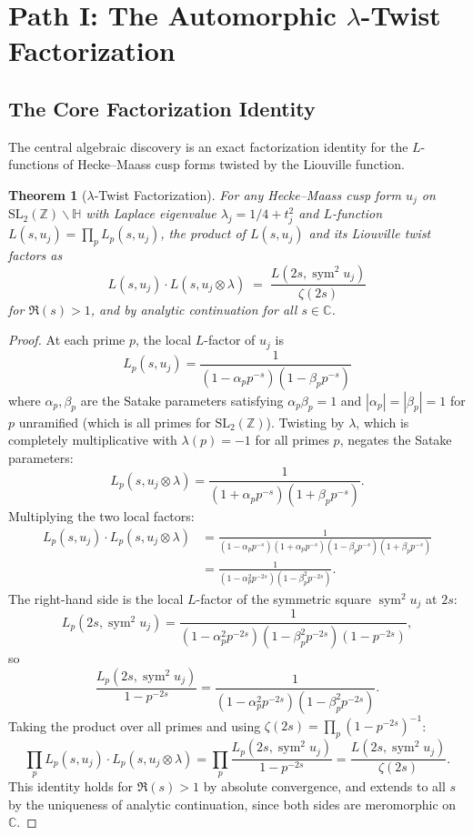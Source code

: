 \documentclass[11pt,a4paper]{article}
\theoremstyle{plain}
\newtheorem{theorem}{Theorem}[section]
\theoremstyle{definition}
\newcommand{\SL}{\mathrm{SL}_2}
\newcommand{\sym}{\operatorname{sym}}
\begin{document}
\section{Path I: The Automorphic $\lambda$-Twist Factorization}

\subsection{The Core Factorization Identity}

The central algebraic discovery is an exact factorization identity for the $L$-functions of Hecke--Maass cusp forms twisted by the Liouville function.

\begin{theorem}[$\lambda$-Twist Factorization]\label{thm:lambda-twist}
For any Hecke--Maass cusp form $u_j$ on $\SL(\mathbb{Z})\backslash \mathbb{H}$ with Laplace eigenvalue $\lambda_j = 1/4 + t_j^2$ and $L$-function $L(s, u_j) = \prod_p L_p(s, u_j)$, the product of $L(s, u_j)$ and its Liouville twist factors as
\begin{equation}\label{eq:factorization}
L(s, u_j) \cdot L(s, u_j \otimes \lambda) \;=\; \frac{L(2s, \sym^2 u_j)}{\zeta(2s)}
\end{equation}
for $\Re(s) > 1$, and by analytic continuation for all $s \in \mathbb{C}$.
\end{theorem}

\begin{proof}
At each prime $p$, the local $L$-factor of $u_j$ is
\[
L_p(s, u_j) = \frac{1}{(1 - \alpha_p p^{-s})(1 - \beta_p p^{-s})}
\]
where $\alpha_p, \beta_p$ are the Satake parameters satisfying $\alpha_p \beta_p = 1$ and $|\alpha_p| = |\beta_p| = 1$ for $p$ unramified (which is all primes for $\SL(\mathbb{Z})$). Twisting by $\lambda$, which is completely multiplicative with $\lambda(p) = -1$ for all primes $p$, negates the Satake parameters:
\[
L_p(s, u_j \otimes \lambda) = \frac{1}{(1 + \alpha_p p^{-s})(1 + \beta_p p^{-s})}.
\]
Multiplying the two local factors:
\begin{align*}
L_p(s, u_j) \cdot L_p(s, u_j \otimes \lambda) &= \frac{1}{(1 - \alpha_p p^{-s})(1 + \alpha_p p^{-s})(1 - \beta_p p^{-s})(1 + \beta_p p^{-s})} \\
&= \frac{1}{(1 - \alpha_p^2 p^{-2s})(1 - \beta_p^2 p^{-2s})}.
\end{align*}
The right-hand side is the local $L$-factor of the symmetric square $\sym^2 u_j$ at $2s$:
\[
L_p(2s, \sym^2 u_j) = \frac{1}{(1 - \alpha_p^2 p^{-2s})(1 - \beta_p^2 p^{-2s})(1 - p^{-2s})},
\]
so
\[
\frac{L_p(2s, \sym^2 u_j)}{1 - p^{-2s}} = \frac{1}{(1 - \alpha_p^2 p^{-2s})(1 - \beta_p^2 p^{-2s})}.
\]
Taking the product over all primes and using $\zeta(2s) = \prod_p (1 - p^{-2s})^{-1}$:
\[
\prod_p L_p(s, u_j) \cdot L_p(s, u_j \otimes \lambda) = \prod_p \frac{L_p(2s, \sym^2 u_j)}{1 - p^{-2s}} = \frac{L(2s, \sym^2 u_j)}{\zeta(2s)}.
\]
This identity holds for $\Re(s) > 1$ by absolute convergence, and extends to all $s$ by the uniqueness of analytic continuation, since both sides are meromorphic on $\mathbb{C}$.
\end{proof}
\end{document}
